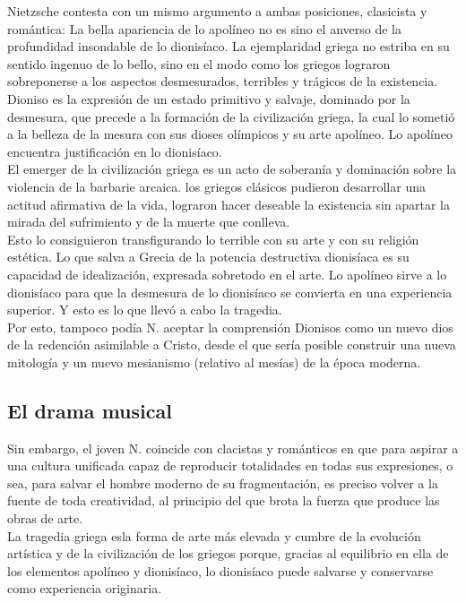 \documentclass[a4paper, 10pt, twocolumn, spanish]{article}
\begin{document}
Nietzsche contesta con un mismo argumento a ambas posiciones,
clasicista y romántica: La bella apariencia de lo apolíneo no es sino
el anverso de la profundidad insondable de lo dionisíaco. La
ejemplaridad griega no estriba en su sentido ingenuo de lo bello, sino
en el modo como los griegos lograron sobreponerse a los aspectos
desmesurados, terribles y trágicos de la existencia. Dioniso es la
expresión de un estado primitivo y salvaje, dominado por la desmesura,
que precede a la formación de la civilización griega, la cual lo
sometió a la belleza de la mesura con sus dioses olímpicos y su arte
apolíneo. Lo apolíneo encuentra justificación en lo dionisíaco.\\[0pt]
El emerger de la civilización griega es un acto de soberanía y
dominación sobre la violencia de la barbarie arcaica. los griegos
clásicos pudieron desarrollar una actitud afirmativa de la vida,
lograron hacer deseable la existencia sin apartar la mirada del
sufrimiento y de la muerte que conlleva.\\[0pt]
Esto lo consiguieron transfigurando lo terrible con su arte y con su
religión estética. Lo que salva a Grecia de la potencia destructiva
dionisíaca es su capacidad de idealización, expresada sobretodo en el
arte. Lo apolíneo sirve a lo dionisíaco para que la desmesura de lo
dionisíaco se convierta en una experiencia superior. Y esto es lo que
llevó a cabo la tragedia.\\[0pt]
Por esto, tampoco podía N. aceptar la comprensión Dionisos como un
nuevo dios de la redención asimilable a Cristo, desde el que sería
posible construir una nueva mitología y un nuevo mesianismo (relativo
al mesías) de la época moderna.

\subsection{El drama musical}
\label{sec:orgc634331}
Sin embargo, el joven N. coincide con clacistas y románticos en que
para aspirar a una cultura unificada capaz de reproducir totalidades
en todas sus expresiones, o sea, para salvar el hombre moderno de su
fragmentación, es preciso volver a la fuente de toda creatividad, al
principio del que brota la fuerza que produce las obras de arte.\\[0pt]
La tragedia griega esla forma de arte más elevada y cumbre de la
evolución artística y de la civilización de los griegos porque,
gracias al equilibrio en ella de los elementos apolíneo y dionisíaco,
lo dionisíaco puede salvarse y conservarse como experiencia
originaria.\\[0pt]
\end{document}
